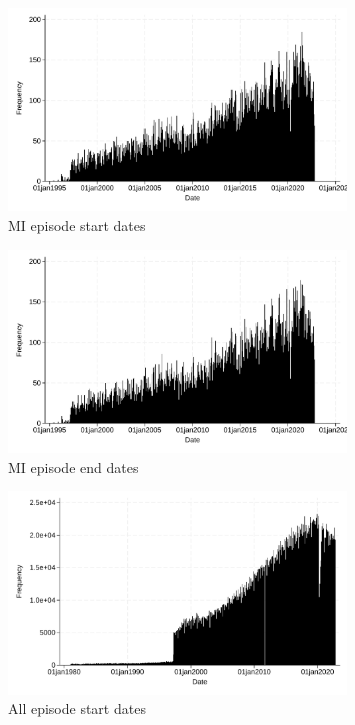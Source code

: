 \documentclass[11pt]{article}
\begin{document}
\color{Blue4}
\begin{figure}[h!]
    \centering
    \caption{MI episode start dates}
    \label{MIsthist}
    \includegraphics[width=0.8\textwidth]{HA_log/16.pdf}
\end{figure}
\begin{figure}[h!]
    \centering
    \caption{MI episode end dates}
    \label{MIenhist}
    \includegraphics[width=0.8\textwidth]{HA_log/16_1.pdf}
\end{figure}
\begin{figure}[h!]
    \centering
    \caption{All episode start dates}
    \label{sthist}
    \includegraphics[width=0.8\textwidth]{HA_log/16_2.pdf}
\end{figure}
\end{document}
